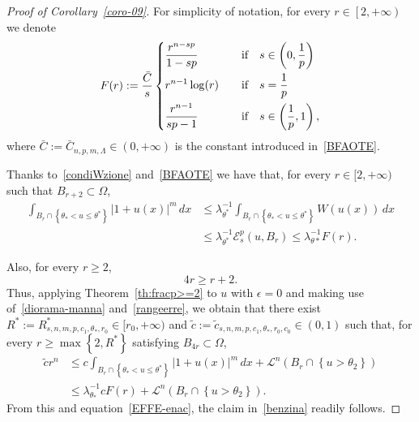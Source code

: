 \documentclass[12pt]{article}
\numberwithin{equation}{section}
\renewcommand{\leq}{\leqslant}
\renewcommand{\geq}{\geqslant}
\begin{document}
\begin{proof}[Proof of Corollary~\ref{coro-09}]
For simplicity of notation, for every $r\in \left[2,+\infty\right)$ we denote 
\begin{equation}\label{EFFE-enac}
F(r):=\frac{\bar{C}}{s}\begin{dcases}
\frac{r^{n-sp}}{1-sp}\quad &\mbox{if}\quad s\in \left(0,\frac{1}{p}\right)\\
r^{n-1}\log(r)\quad &\mbox{if}\quad s=\frac{1}{p}\\
\frac{r^{n-1}}{sp-1}\quad &\mbox{if}\quad s\in \left(\frac{1}{p},1\right),
\end{dcases}
\end{equation}
where $\bar{C}:=\bar{C}_{n,p,m,\Lambda}\in(0,+\infty)$ is the constant introduced in~\eqref{BFAOTE}. 

Thanks to~\eqref{condiWzione} and~\eqref{BFAOTE} we have that, for every $r\in [2,+\infty)$ such that $B_{r+2}\subset \Omega$,
\begin{equation}\label{diorama-manna}
\begin{split}
\int_{B_r\cap \left\lbrace \theta_*<u\leq \theta^* \right\rbrace}\left|1+u(x)\right|^m\,dx &\leq \lambda_{\theta^*}^{-1} \int_{B_r\cap \left\lbrace \theta_*<u\leq \theta^* \right\rbrace}W(u(x))\,dx\\
&\leq \lambda_{\theta^*}^{-1}\mathcal{E}_s^p(u,B_r)\leq \lambda_{\theta*}^{-1}F(r). 
\end{split}
\end{equation}

Also, for every $r\geq 2$, 
\begin{equation}\label{rangeerre}
4r\geq r+2. 
\end{equation}
Thus, applying Theorem~\ref{th:fracp>=2} to $u$ with $\epsilon=0$ and making use of~\eqref{diorama-manna} and~\eqref{rangeerre}, we obtain that there exist~$R^*:=R_{s,n,m,p,c_1,\theta_*,r_0}^*\in [r_0,+\infty)$ and $\tilde{c}:=\tilde{c}_{s,n,m,p,c_1,\theta_*,r_0,c_0}\in (0,1)$ such that, for every $r\geq \max \left\lbrace 2, R^* \right\rbrace$ satisfying $B_{4r}\subset \Omega$, 
\begin{equation*}
\begin{split}
\tilde{c}r^n &\leq c \int_{B_r\cap \left\lbrace \theta_*<u\leq \theta^* \right\rbrace} \left|1+u(x)\right|^m\,dx+\mathcal{L}^n\left(B_r\cap \left\lbrace u>\theta_2\right\rbrace\right)\\
&\leq \lambda_{\theta_*}^{-1}cF(r)+ \mathcal{L}^n\left(B_r\cap \left\lbrace u>\theta_2\right\rbrace\right).
\end{split}
\end{equation*}
From this and equation~\eqref{EFFE-enac}, the claim in~\eqref{benzina} readily follows.  


\end{proof}
\end{document}
